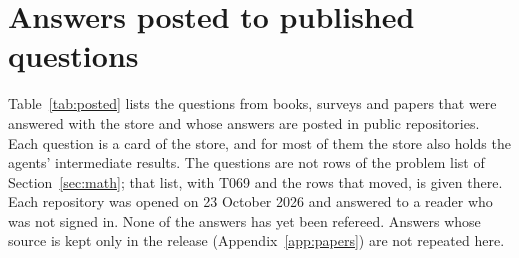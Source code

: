 \section{Answers posted to published questions}\label{app:posted}

Table~\ref{tab:posted} lists the questions from books, surveys and papers that were answered with the store and whose answers are posted in public repositories. Each question is a card of the store, and for most of them the store also holds the agents' intermediate results. The questions are not rows of the problem list of Section~\ref{sec:math}; that list, with T069 and the rows that moved, is given there. Each repository was opened on 23 October 2026 and answered to a reader who was not signed in. None of the answers has yet been refereed. Answers whose source is kept only in the release (Appendix~\ref{app:papers}) are not repeated here.

